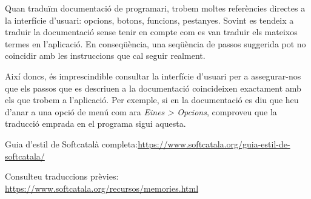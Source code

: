 \documentclass[9pt]{cheatsheet}
\begin{document}
\begin{multicols*}{3}
Quan traduïm documentació de programari, trobem moltes referències directes a la interfície d’usuari: opcions, botons, funcions, pestanyes. Sovint es tendeix a traduir la documentació sense tenir en compte com es van traduir els mateixos termes en l’aplicació. En conseqüència, una seqüència de passos suggerida pot no coincidir amb les instruccions que cal seguir realment. 

Així doncs, és imprescindible consultar la interfície d’usuari per a assegurar-nos que els passos que es descriuen a la documentació coincideixen exactament amb els que trobem a l’aplicació. Per exemple, si en la documentació es diu que heu d’anar a una opció de menú com ara \emph{Eines > Opcions}, comproveu que la traducció emprada en el programa sigui aquesta.


Guia d'estil de Softcatalà completa:\url{https://www.softcatala.org/guia-estil-de-softcatala/}

Consulteu traduccions prèvies: \url{https://www.softcatala.org/recursos/memories.html}

\end{multicols*}
\end{document}
